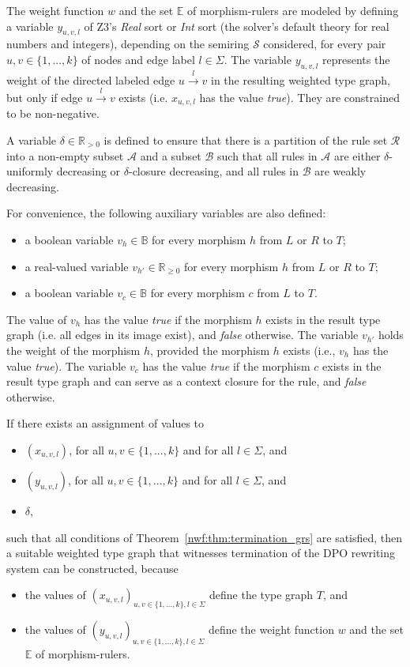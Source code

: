 The weight function $w$ and the set $\mathbb{E}$ of morphism-rulers are modeled by defining 
a variable $y_{u,v,l}$ of Z3's \textit{Real} sort or \textit{Int} sort (the solver's default theory for real numbers and integers), depending on the semiring $\mathcal{S}$ considered,
 for every pair $u,v\in\{1,...,k\}$ of nodes and edge label $l \in \Sigma$. 
The variable $y_{u,v,l}$ represents the weight of the directed labeled edge $u\overset{l}{\to} v$ in the resulting weighted type graph, but only if edge $u\overset{l}{\to} v$ exists (i.e. $x_{u,v,l}$ has the value \textit{true}). 
They are constrained to be non-negative.

A variable $\delta \in \mathbb{R}_{>0}$ is defined to ensure that there is
a partition of the rule set $\mathcal{R}$ into a non-empty subset $\mathcal{A}$ and a subset $\mathcal{B}$ such that all rules in $\mathcal{A}$ are either $\delta$-uniformly decreasing or $\delta$-closure decreasing, and all rules in $\mathcal{B}$ are weakly decreasing.

For convenience, the following auxiliary variables are also defined:
\begin{itemize}
    \item a boolean variable $v_h \in \mathbb{B}$ for every morphism $h$ from $L$ or $R$ to $T$;
    \item a real-valued variable $v_{h'} \in \mathbb{R}_{\geq 0}$ for every morphism $h$ from $L$ or $R$ to $T$;
    \item a boolean variable $v_c \in \mathbb{B}$ for every morphism $c$ from $L$ to $T$.
\end{itemize}  
The value of $v_h$ has the value \textit{true} if the morphism $h$ exists in the result type graph (i.e. all edges in its image exist), and \textit{false} otherwise.
The variable $v_{h'}$ holds the weight of the morphism $h$, provided the morphism $h$ exists (i.e., $v_h$ has the value \textit{true}).
The variable $v_c$ has the value \textit{true} if the morphism $c$ exists in the result type graph and can serve as a context closure for the rule, and \textit{false} otherwise.

If there exists an assignment of values to 
    \begin{itemize}
        \item $(x_{u,v,l})$, for all $u,v \in \{1,...,k\}$ and for all $l \in \Sigma$, and
        \item $(y_{u,v,l})$, for all $u,v \in \{1,...,k\}$ and for all $l \in \Sigma$, and
        \item $\delta$,
    \end{itemize} 
    such that all conditions of Theorem~\ref{nwf:thm:termination_grs} are satisfied, then a suitable weighted type graph that witnesses termination of the DPO rewriting system can be constructed, because
    \begin{itemize}
        \item the values of \( (x_{u,v,l})_{u,v \in \{1,...,k\}, l \in \Sigma} \) define the type graph $T$, and
        \item the values of \( (y_{u,v,l})_{u,v \in \{1,...,k\}, l \in \Sigma} \) define the weight function $w$ and the set $\mathbb{E}$ of morphism-rulers.
    \end{itemize} 